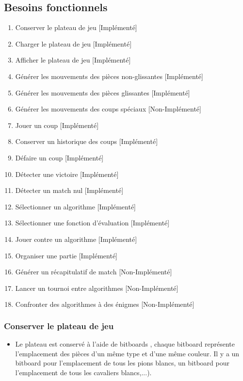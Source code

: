 \documentclass{article}
\begin{document}
\subsection{Besoins fonctionnels}
\medskip

\begin{enumerate}
    \item Conserver le plateau de jeu \hfill[Implémenté]
    \medskip
    \item Charger le plateau de jeu \hfill[Implémenté]
    \medskip
    \item Afficher le plateau de jeu \hfill[Implémenté]
    \medskip
    \item Générer les mouvements des pièces non-glissantes \hfill[Implémenté]
    \medskip
    \item Générer les mouvements des pièces glissantes \hfill[Implémenté]
    \medskip
    \item Générer les mouvements des coups spéciaux \hfill[Non-Implémenté]
    \medskip
    \item Jouer un coup \hfill[Implémenté]
    \medskip
    \item Conserver un historique des coups \hfill[Implémenté]
    \medskip
    \item Défaire un coup \hfill[Implémenté]
    \medskip
    \item Détecter une victoire \hfill[Implémenté]
    \medskip
    \item Détecter un match nul \hfill[Implémenté]
    \medskip
    \item Sélectionner un algorithme \hfill[Implémenté]
    \medskip
    \item Sélectionner une fonction d'évaluation \hfill[Implémenté]
    \medskip
    \item Jouer contre un algorithme \hfill[Implémenté]
    \medskip
    \item Organiser une partie \hfill[Implémenté]
    \medskip
    \item Générer un récapitulatif de match \hfill[Non-Implémenté]
    \medskip
    \item Lancer un tournoi entre algorithmes \hfill[Non-Implémenté]
    \medskip
    \item Confronter des algorithmes à des énigmes \hfill[Non-Implémenté]
    \medskip
\end{enumerate}

\subsubsection{Conserver le plateau de jeu}
\medskip
\begin{itemize}
    \item Le plateau est conservé à l'aide de bitboards \cite{Bitboards}, chaque bitboard représente l'emplacement des pièces d'un même type et d'une même couleur. Il y a un bitboard pour l'emplacement de tous les pions blancs, un bitboard pour l'emplacement de tous les cavaliers blancs,...).
\end{itemize}
\newpage
\end{document}
